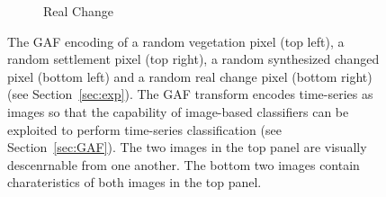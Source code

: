 \documentclass{article}
\begin{document}
\begin{figure}[h]
\begin{subfigure}[b]{0.5\linewidth}
    \caption{Real Change} 
    \label{fig7:d} 
  \end{subfigure} 
  \label{fig7} 
  \caption{The GAF encoding of a random vegetation pixel (top left), a random settlement pixel (top right), a random synthesized changed pixel (bottom left) and a random real change pixel (bottom right) (see Section~\ref{sec:exp}). The GAF transform encodes time-series as images so that the capability of image-based classifiers can be exploited to perform time-series classification (see Section~\ref{sec:GAF}).  The two images in the top panel are visually descenrnable from one another. The bottom two images contain charateristics of both images in the top panel.}
  \label{fig:results}
\end{figure}











\end{document}
